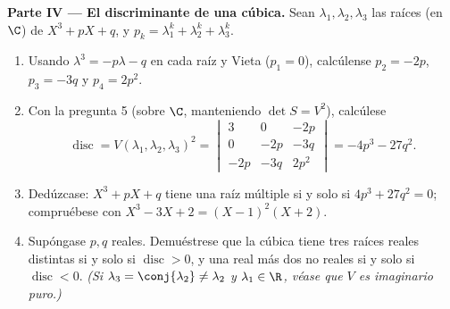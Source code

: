 \begin{problem}
\medskip
\noindent\textbf{Parte IV --- El discriminante de una cúbica.} Sean
$\lambda_1, \lambda_2, \lambda_3$ las raíces (en $\C$) de
$X^3 + pX + q$, y $p_k = \lambda_1^k + \lambda_2^k + \lambda_3^k$.
\begin{enumerate}[resume]
  \item Usando $\lambda^3 = -p\lambda - q$ en cada raíz y Vieta
        ($p_1 = 0$), calcúlense $p_2 = -2p$, $p_3 = -3q$ y
        $p_4 = 2p^2$.
  \item Con la pregunta 5 (sobre $\C$, manteniendo $\det S = V^2$),
        calcúlese
        \[
        \operatorname{disc} = V(\lambda_1, \lambda_2,
        \lambda_3)^2 = \begin{vmatrix}
        3 & 0 & -2p\\
        0 & -2p & -3q\\
        -2p & -3q & 2p^2
        \end{vmatrix}
        = -4p^3 - 27q^2 .
        \]
  \item Dedúzcase: $X^3 + pX + q$ tiene una raíz múltiple si y solo
        si $4p^3 + 27q^2 = 0$; compruébese con
        $X^3 - 3X + 2 = (X - 1)^2(X + 2)$.
  \item Supóngase $p, q$ reales. Demuéstrese que la cúbica tiene
        tres raíces reales distintas si y solo si
        $\operatorname{disc} > 0$, y una real más dos  no
        reales si y solo si $\operatorname{disc} < 0$. \emph{(Si
        $\lambda_3 = \conj{\lambda_2} \neq \lambda_2$ y
        $\lambda_1 \in \R$, véase que $V$ es imaginario puro.)}
\end{enumerate}


\end{problem}
